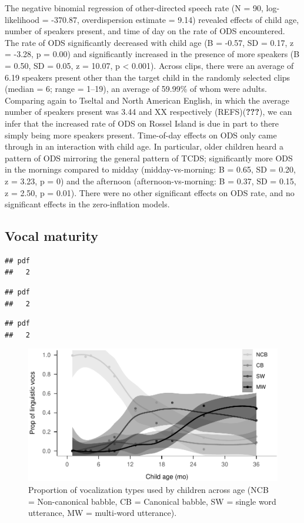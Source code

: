 \documentclass[,man,floatsintext]{apa6}
\begin{document}
The negative binomial regression of other-directed speech rate (N = 90,
log-likelihood = -370.87, overdispersion estimate = 9.14) revealed
effects of child age, number of speakers present, and time of day on the
rate of ODS encountered. The rate of ODS significantly decreased with
child age (B = -0.57, SD = 0.17, z = -3.28, p = 0.00) and significantly
increased in the presence of more speakers (B = 0.50, SD = 0.05, z =
10.07, p \textless{} 0.001). Across clips, there were an average of 6.19
speakers present other than the target child in the randomly selected
clips (median = 6; range = 1--19), an average of 59.99\% of whom were
adults. Comparing again to Tseltal and North American English, in which
the average number of speakers present was 3.44 and XX respectively
(REFS)({\textbf{???}}), we can infer that the increased rate of ODS on
Rossel Island is due in part to there simply being more speakers
present. Time-of-day effects on ODS only came through in an interaction
with child age. In particular, older children heard a pattern of ODS
mirroring the general pattern of TCDS; significantly more ODS in the
mornings compared to midday (midday-vs-morning: B = 0.65, SD = 0.20, z =
3.23, p = 0) and the afternoon (afternoon-vs-morning: B = 0.37, SD =
0.15, z = 2.50, p = 0.01). There were no other significant effects on
ODS rate, and no significant effects in the zero-inflation models.

\subsection{Vocal maturity}\label{vocal-maturity}

\begin{verbatim}
## pdf 
##   2
\end{verbatim}

\begin{verbatim}
## pdf 
##   2
\end{verbatim}

\begin{verbatim}
## pdf 
##   2
\end{verbatim}

\begin{figure}
\centering
\includegraphics{Yeli-CLE_files/figure-latex/fig6-1.pdf}
\caption{\label{fig:fig6}Proportion of vocalization types used by children
across age (NCB = Non-canonical babble, CB = Canonical babble, SW =
single word utterance, MW = multi-word utterance).}
\end{figure}
\end{document}
